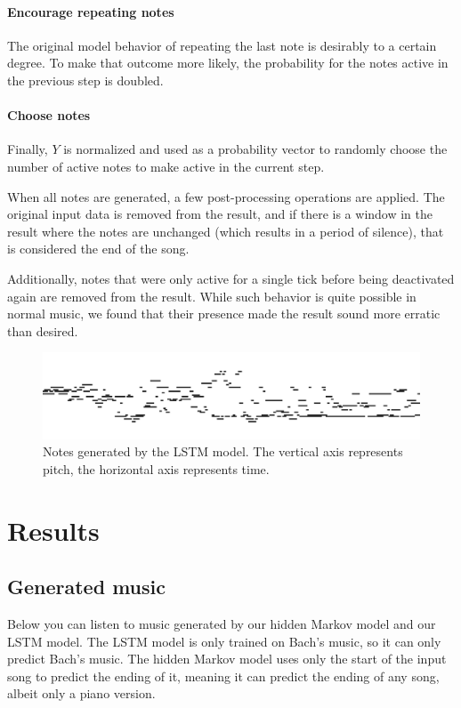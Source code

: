 \documentclass[11pt, twocolumn]{article}
\begin{document}
\paragraph{Encourage repeating notes} The original model behavior of repeating the last note is desirably to a certain degree. To make that outcome more likely, the probability for the notes active in the previous step is doubled.

\paragraph{Choose notes} Finally, $Y$ is normalized and used as a probability vector to randomly choose the number of active notes to make active in the current step.

\mbox{} %

When all notes are generated, a few post-processing operations are applied. The original input data is removed from the result, and if there is a window in the result where the notes are unchanged (which results in a period of silence), that is considered the end of the song. 

Additionally, notes that were only active for a single tick before being deactivated again are removed from the result. While such behavior is quite possible in normal music, we found that their presence made the result sound more erratic than desired. 

\begin{figure}[H]
    \includegraphics[width=\linewidth]{images/lstm_samples.png}
    \caption{Notes generated by the LSTM model. The vertical axis represents pitch, the horizontal axis represents time.}
    \label{fig:lstm_predicted}
\end{figure}

\section{Results}



\ifpdf
\else
\subsection{Generated music}
Below you can listen to music generated by our hidden Markov model and our LSTM model. The LSTM model is only trained on Bach's music, so it can only predict Bach's music. The hidden Markov model uses only the start of the input song to predict the ending of it, meaning it can predict the ending of any song, albeit only a piano version.
\end{document}
